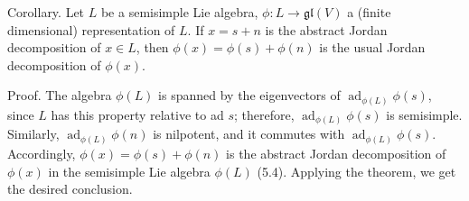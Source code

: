 \documentclass[10pt]{article}
\begin{document}
Corollary. Let $L$ be a semisimple Lie algebra, $\phi: L \rightarrow \mathfrak{g l}(V)$ a (finite dimensional) representation of $L$. If $x=s+n$ is the abstract Jordan decomposition of $x \in L$, then $\phi(x)=\phi(s)+\phi(n)$ is the usual Jordan decomposition of $\phi(x)$.

Proof. The algebra $\phi(L)$ is spanned by the eigenvectors of $\operatorname{ad}_{\phi(L)} \phi(s)$, since $L$ has this property relative to ad $s$; therefore, $\operatorname{ad}_{\phi(L)} \phi(s)$ is semisimple. Similarly, $\operatorname{ad}_{\phi(L)} \phi(n)$ is nilpotent, and it commutes with $\operatorname{ad}_{\phi(L)} \phi(s)$. Accordingly, $\phi(x)=\phi(s)+\phi(n)$ is the abstract Jordan decomposition of $\phi(x)$ in the semisimple Lie algebra $\phi(L)$ (5.4). Applying the theorem, we get the desired conclusion.
\end{document}

